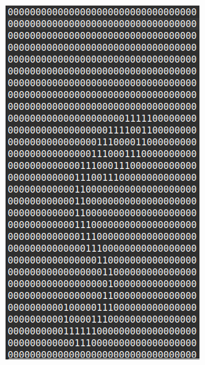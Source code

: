 \begin{figure}[htbp]
	\vspace{0.5cm}
	\begin{subfigure}[b]{0.2\linewidth}
		\includegraphics[width=1\linewidth]{pics/wrong_output_predict5.png}
		\label{fig:sub4}
	\end{subfigure}
	\hfill
	\begin{subfigure}[b]{0.2\linewidth}

\end{subfigure}
\end{figure}
